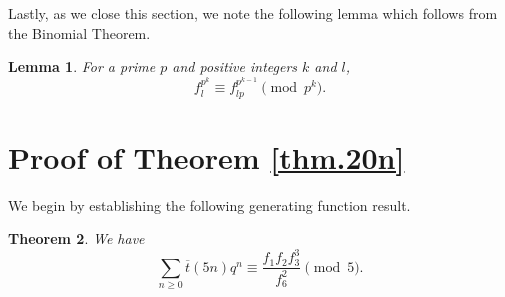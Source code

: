 \documentclass{amsart}
\newtheorem{theorem}{Theorem}[section]
\newtheorem{lemma}[theorem]{Lemma}
\theoremstyle{definition}
\newcommand{\tbar}{\overline{t}}
\begin{document}
{Lastly, as we close this section, we note the following lemma which follows from the Binomial Theorem.}
\begin{lemma}
    For a prime $p$ and positive integers $k$ and $l$,
    \begin{equation}\label{bt}
        f_l^{p^k}\equiv f_{lp}^{p^{k-1}}\pmod{p^k}.
    \end{equation}
\end{lemma}





\section{Proof of Theorem \ref{thm.20n}}\label{sec.proof}

We begin by establishing the following generating function result.
\begin{theorem}\label{thm.main}
We have
\begin{equation}
\sum_{n\geq0}\tbar(5n)q^{n}
\equiv\frac{f_1f_2f_3^{3}}{f_6^{2}}\pmod5 .
\label{eq.main}
\end{equation}
\end{theorem}
\end{document}
